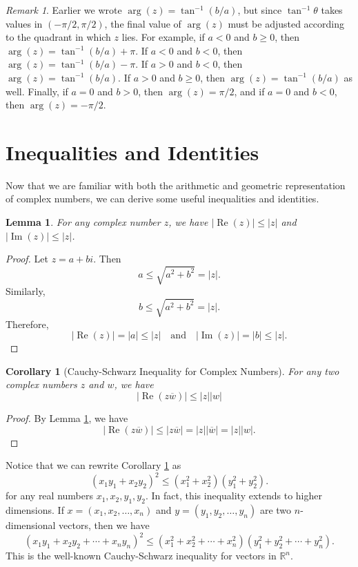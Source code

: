 \documentclass[11pt,oneside,reqno]{amsart}
\newcommand\R{{\mathbb R}}
\numberwithin{equation}{section}
\newtheorem{lemma}[theorem]{Lemma}
\newtheorem{cor}[theorem]{Corollary}
\theoremstyle{definition}
\theoremstyle{remark}
\newtheorem{remark}[theorem]{Remark}
\begin{document}
\begin{remark}
    Earlier we wrote $\arg(z) = \tan^{-1}(b/a)$, but since $\tan^{-1}\theta$ takes values in $(-\pi/2, \pi/2)$, the final value of $\arg(z)$ must be adjusted according to the quadrant in which $z$ lies. For example, if $a < 0$ and $b \geq 0$, then $\arg(z) = \tan^{-1}(b/a) + \pi$. If $a < 0$ and $b < 0$, then $\arg(z) = \tan^{-1}(b/a) - \pi$. If $a > 0$ and $b < 0$, then $\arg(z) = \tan^{-1}(b/a)$. If $a > 0$ and $b \geq 0$, then $\arg(z) = \tan^{-1}(b/a)$ as well. Finally, if $a = 0$ and $b > 0$, then $\arg(z) = \pi/2$, and if $a = 0$ and $b < 0$, then $\arg(z) = -\pi/2$. 
\end{remark}

\section{Inequalities and Identities} Now that we are familiar with both the arithmetic and geometric representation of complex numbers, we can derive some useful inequalities and identities.
\begin{lemma}\label{lemma:absineq}
    For any complex number $z$, we have $|\operatorname{Re}(z)| \leq |z|$ and $|\operatorname{Im}(z)| \leq |z|$.
\end{lemma}
\begin{proof}
    Let $z = a + bi$. Then 
    \[a \leq \sqrt{a^2 + b^2} = |z|.\]
    Similarly,
    \[b \leq \sqrt{a^2 + b^2} = |z|.\]
    Therefore,
    \[|\operatorname{Re}(z)| = |a| \leq |z| \quad \text{and} \quad |\operatorname{Im}(z)| = |b| \leq |z|.\]
\end{proof}

\begin{cor}[Cauchy-Schwarz Inequality for Complex Numbers]\label{cor:cauchy}
    For any two complex numbers $z$ and $w$, we have
    \[|\operatorname{Re}(z\overline{w})| \leq |z||w|\]
\end{cor}
\begin{proof}
    By Lemma \ref{lemma:absineq}, we have
    \[|\operatorname{Re}(z\overline{w})| \leq |z\overline{w}| = |z||\overline{w}| = |z||w|.\]
\end{proof}

Notice that we can rewrite Corollary \ref{cor:cauchy} as 
\[(x_1y_1 + x_2y_2)^2 \leq (x_1^2 + x_2^2)(y_1^2 + y_2^2).\]
for any real numbers $x_1, x_2, y_1, y_2$. In fact, this inequality extends to higher dimensions. If $x = (x_1, x_2, \dots, x_n)$ and $y = (y_1, y_2, \dots, y_n)$ are two $n$-dimensional vectors, then we have
\[(x_1y_1 + x_2y_2 + \cdots + x_ny_n)^2 \leq (x_1^2 + x_2^2 + \cdots + x_n^2)(y_1^2 + y_2^2 + \cdots + y_n^2).\]
This is the well-known Cauchy-Schwarz inequality for vectors in $\R^n$.
\end{document}
